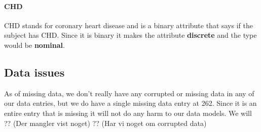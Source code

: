 \paragraph{CHD} CHD stands for coronary heart disease and is a binary attribute that says if the subject has CHD. Since it is binary it makes the attribute \textbf{discrete} and the type would be \textbf{nominal}.

\subsection{Data issues}

As of missing data, we don't really have any corrupted or missing data in any of our data entries, but we do have a single missing data entry at 262. Since it is an entire entry that is missing it will not do any harm to our data models. We will ?? (Der mangler vist noget) ?? (Har vi noget om corrupted data)